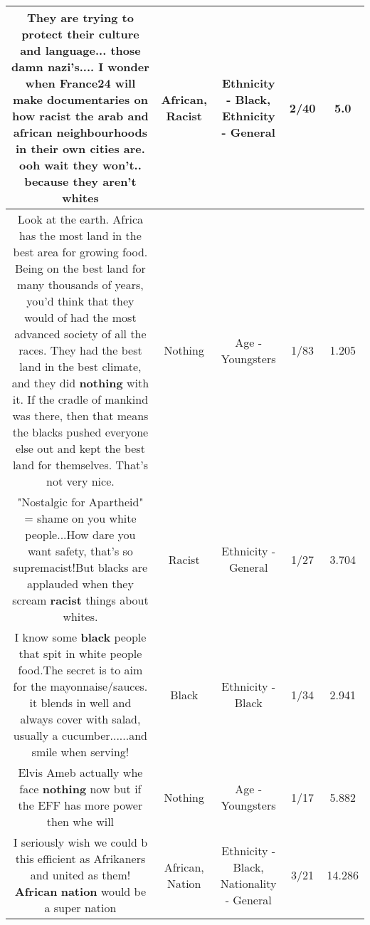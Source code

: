 \documentclass[11pt]{article}
\newlength\mylength
\begin{document}
\begin{center}
\begin{longtable}{|C{.65\mylength}|C{.30\mylength}|C{.12\mylength}|C{.12\mylength}|C{.12\mylength}|}
  \small They are trying to protect their culture and language... those damn nazi's.... I wonder when France24 will make documentaries on how \textbf{racist} the arab and \textbf{african} neighbourhoods in their own cities are. ooh wait they won't.. because they aren't whites\normalsize   & African, Racist & Ethnicity - Black, Ethnicity - General & 2/40 & 5.0 \\  \hline
  \small Look at the earth. Africa has the most land in the best area for growing food. Being on the best land for many thousands of years, you'd think that they would of had the most advanced society of all the races. They had the best land in the best climate, and they did \textbf{nothing} with it. If the cradle of mankind was there, then that means the blacks pushed everyone else out and kept the best land for themselves. That's not very nice.\normalsize   & Nothing & Age - Youngsters & 1/83 & 1.205 \\  \hline
  \small "Nostalgic for Apartheid" = shame on you white people...How dare you want safety, that's so supremacist!But blacks are applauded when they scream \textbf{racist} things about whites.\normalsize   & Racist & Ethnicity - General & 1/27 & 3.704 \\  \hline
  \small I know some \textbf{black} people that spit in white people food.The secret is to aim for the mayonnaise/sauces. it blends in well and always cover with salad, usually a cucumber......and smile when serving!\normalsize   & Black & Ethnicity - Black & 1/34 & 2.941 \\  \hline
  \small Elvis Ameb actually whe face \textbf{nothing} now but if the EFF has more power then whe will\normalsize   & Nothing & Age - Youngsters & 1/17 & 5.882 \\  \hline
  \small I seriously wish we could b this efficient as Afrikaners and united as them! \textbf{African} \textbf{nation} would be a super nation\normalsize   & African, Nation & Ethnicity - Black, Nationality - General & 3/21 & 14.286 \\  \hline

\end{longtable}
\end{center}
\end{document}
